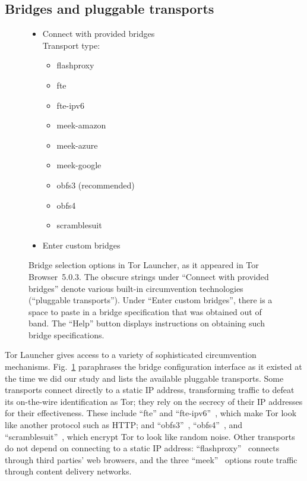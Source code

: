 \documentclass[USenglish,oneside,twocolumn]{article}
\begin{document}
\subsection{Bridges and pluggable transports}

\begin{figure}
\small
\begin{itemize}
\renewcommand{\labelitemi}{$\circ$}
\item Connect with provided bridges\\
Transport type:
\begin{itemize}
\item flashproxy
\item fte
\item fte-ipv6
\item meek-amazon
\item meek-azure
\item meek-google
\item obfs3 (recommended)
\item obfs4
\item scramblesuit
\end{itemize}
\item Enter custom bridges\qquad{}\\
\end{itemize}
\caption{
Bridge selection options in Tor Launcher, as it appeared in Tor Browser~5.0.3.
The obscure strings under ``Connect with provided bridges'' denote various
built-in circumvention technologies (``pluggable transports'').
Under ``Enter custom bridges'', there is a space to paste in
a bridge specification that was obtained out of band.
The ``Help'' button displays instructions on obtaining such
bridge specifications.
}
\label{fig:bridge-options}
\end{figure}

Tor Launcher gives access to a variety of sophisticated
circumvention mechanisms.
Fig.~\ref{fig:bridge-options} paraphrases the bridge configuration
interface as it existed at the time we did our study
and lists the available pluggable transports.
Some transports connect directly to a static IP address,
transforming traffic to defeat its on-the-wire identification as Tor;
they rely on the secrecy of their IP addresses for their effectiveness.
These include ``fte'' and ``fte-ipv6''~\cite{fte},
which make Tor look like another protocol such as HTTP; and
``obfs3''~\cite{obfs3}, ``obfs4''~\cite{obfs4}, and ``scramblesuit''~\cite{scramblesuit},
which encrypt Tor to look like random noise.
Other transports do not depend on connecting to a static IP address:
``flashproxy''~\cite{flashproxy} connects through third parties' web browsers,
and the three ``meek''~\cite{fifield2015blocking} options route traffic
through content delivery networks.
\end{document}
